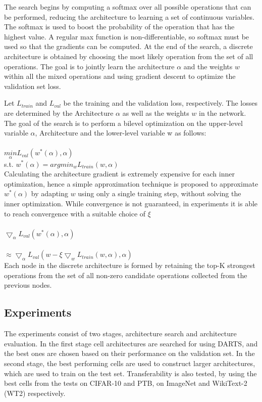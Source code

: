 \documentclass{ieee}
\begin{document}
The search begins by computing a softmax over all possible operations that can be performed, reducing the architecture to learning a set of continuous variables. The softmax is used to boost the probability of the operation that has the highest value. A regular max function is non-differentiable, so softmax must be used so that the gradients can be computed. At the end of the search, a discrete architecture is obtained by choosing the most likely operation from the set of all operations. The goal is to jointly learn the architecture $\alpha$ and the weights $w$ within all the mixed operations and using gradient descent to optimize the validation set loss.

Let $L_{train}$ and $L_{val}$ be the training and the validation loss, respectively. The losses are determined by the Architecture $\alpha$ as well as the weights $w$ in the network. The goal of the search is to perform a bilevel optimization on the upper-level variable $\alpha$, Architecture  and the lower-level variable w as follows:\\ \\
$\underset{\alpha}{min}  L_{val}(w^*(\alpha), \alpha)$ \\ 

s.t. $ w^* (\alpha) = argmin_w L_{train}(w, \alpha)$ \\

Calculating the architecture gradient is extremely expensive for each inner optimization, hence a simple approximation technique is proposed to approximate $ w^*( \alpha ) $ by adapting $w$ using only a single training step, without solving the inner optimization. While convergence is not guaranteed, in experiments it is able to reach convergence with a suitable choice of $\xi$ \\ \\
$\bigtriangledown_\alpha L_{val}(w^*(\alpha), \alpha)$ \\ \\ 
$\approx \bigtriangledown_\alpha L_{val}(w - \xi \bigtriangledown_w L_{train}(w, \alpha), \alpha)$ \\

Each node in the discrete architecture is formed by retaining the top-K strongest operations from the set of all non-zero candidate operations collected from the previous nodes.

\subsection{Experiments}
The experiments consist of two stages, architecture search and architecture evaluation. In the first stage cell architectures are searched for using DARTS, and the best ones are chosen based on their performance on the validation set. In the second stage, the best performing cells are used to construct larger architectures, which are used to train on the test set. Transferability is also tested, by using the best cells from the tests on CIFAR-10 and PTB, on ImageNet and WikiText-2 (WT2) respectively.
\end{document}
